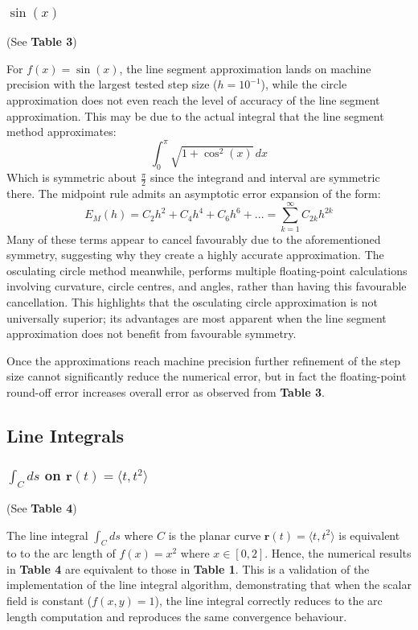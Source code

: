 \documentclass{article}
\begin{document}
\subsubsection{$\sin(x)$}
(See \textbf{Table 3})

For $f(x) = \sin(x)$, the line segment approximation lands on machine precision with the largest tested step size ($h = 10^{-1}$), while the circle approximation does not even reach the level of accuracy of the line segment approximation. This may be due to the actual integral that the line segment method approximates:
\[
\int_{0}^{\pi}\sqrt{1+\cos^2(x)}\,dx
\]
Which is symmetric about $\frac{\pi}{2}$ since the integrand and interval are symmetric there. The midpoint rule admits an asymptotic error expansion of the form:
\[
E_M(h)=C_2h^2+C_4h^4+C_6h^6+ ... = \sum_{k=1}^\infty C_{2k}h^{2k}
\]
Many of these terms appear to cancel favourably due to the aforementioned symmetry, suggesting why they create a highly accurate approximation. The osculating circle method meanwhile, performs multiple floating-point calculations involving curvature, circle centres, and angles, rather than having this favourable cancellation. This highlights that the osculating circle approximation is not universally superior; its advantages are most apparent when the line segment approximation does not benefit from favourable symmetry.

Once the approximations reach machine precision further refinement of the step size cannot significantly reduce the numerical error, but in fact the floating-point round-off error increases overall error as observed from \textbf{Table 3}.

\subsection{Line Integrals}
\subsubsection{$\int_{C}ds$ on $\mathbf{r}(t)=\langle t, t^2\rangle$}
(See \textbf{Table 4})

The line integral $\int_{C}ds$ where $C$ is the planar curve $\mathbf{r}(t)=\langle t, t^2\rangle$ is equivalent to to the arc length of $f(x)=x^2$ where $x\in[0,2]$. Hence, the numerical results in \textbf{Table 4} are equivalent to those in \textbf{Table 1}. This is a validation of the implementation of the line integral algorithm, demonstrating that when the scalar field is constant ($f(x,y)=1$), the line integral correctly reduces to the arc length computation and reproduces the same convergence behaviour.
\end{document}

